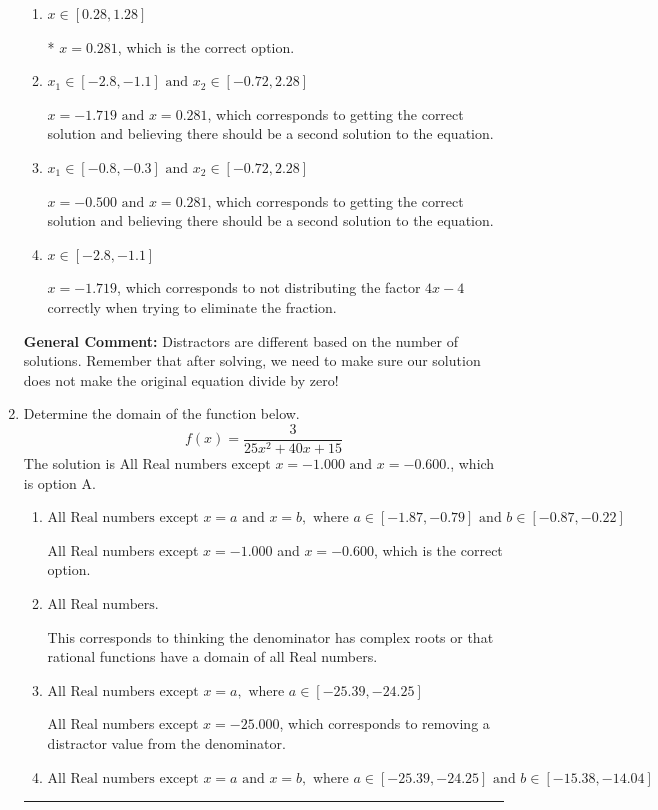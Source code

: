 \documentclass{extbook}[14pt]
\newcommand{\litem}[1]{\item #1

\rule{\textwidth}{0.4pt}}
\begin{document}
\begin{enumerate}
{\begin{enumerate}[label=\Alph*.]
This corresponds to thinking $x = 0.281$ leads to dividing by zero in the original equation, which it does not.
\item \( x \in [0.28,1.28] \)

* $x = 0.281$, which is the correct option.
\item \( x_1 \in [-2.8, -1.1] \text{ and } x_2 \in [-0.72,2.28] \)

$x = -1.719 \text{ and } x = 0.281$, which corresponds to getting the correct solution and believing there should be a second solution to the equation.
\item \( x_1 \in [-0.8, -0.3] \text{ and } x_2 \in [-0.72,2.28] \)

$x = -0.500 \text{ and } x = 0.281$, which corresponds to getting the correct solution and believing there should be a second solution to the equation.
\item \( x \in [-2.8,-1.1] \)

$x = -1.719$, which corresponds to not distributing the factor $4x -4$ correctly when trying to eliminate the fraction.
\end{enumerate}

\textbf{General Comment:} Distractors are different based on the number of solutions. Remember that after solving, we need to make sure our solution does not make the original equation divide by zero!
}
\litem{
Determine the domain of the function below.
\[ f(x) = \frac{3}{25x^{2} +40 x + 15} \]
The solution is \( \text{All Real numbers except } x = -1.000 \text{ and } x = -0.600. \), which is option A.\begin{enumerate}[label=\Alph*.]
\item \( \text{All Real numbers except } x = a \text{ and } x = b, \text{ where } a \in [-1.87, -0.79] \text{ and } b \in [-0.87, -0.22] \)

All Real numbers except $x = -1.000$ and $x = -0.600$, which is the correct option.
\item \( \text{All Real numbers.} \)

This corresponds to thinking the denominator has complex roots or that rational functions have a domain of all Real numbers.
\item \( \text{All Real numbers except } x = a, \text{ where } a \in [-25.39, -24.25] \)

All Real numbers except $x = -25.000$, which corresponds to removing a distractor value from the denominator.
\item \( \text{All Real numbers except } x = a \text{ and } x = b, \text{ where } a \in [-25.39, -24.25] \text{ and } b \in [-15.38, -14.04] \)


\end{enumerate}}
\end{enumerate}
\end{document}
